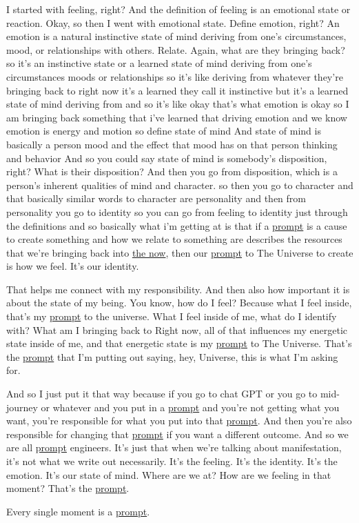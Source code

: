 I started with feeling, right? And the definition of feeling is an emotional state or reaction. Okay, so then I went with emotional state. Define emotion, right? An emotion is a natural instinctive state of mind deriving from one's circumstances, mood, or relationships with others. Relate. Again, what are they bringing back? so it's an instinctive state or a learned state of mind deriving from one's circumstances moods or relationships so it's like deriving from whatever they're bringing back to right now it's a learned they call it instinctive but it's a learned state of mind deriving from and so it's like okay that's what emotion is okay so I am bringing back something that i've learned that driving emotion and we know emotion is energy and motion so define state of mind And state of mind is basically a person mood and the effect that mood has on that person thinking and behavior And so you could say state of mind is somebody's disposition, right? What is their disposition? And then you go from disposition, which is a person's inherent qualities of mind and character. so then you go to character and that basically similar words to character are personality and then from personality you go to identity so you can go from feeling to identity just through the definitions and so basically what i'm getting at is that if a \hyperlink{gloss:prompt}{prompt} is a cause to create something and how we relate to something are describes the resources that we're bringing back into \hyperlink{gloss:the_now}{the now}, then our \hyperlink{gloss:prompt}{prompt} to The Universe to create is how we feel. It's our identity. 

That helps me connect with my responsibility. And then also how important it is about the state of my being. You know, how do I feel? Because what I feel inside, that's my \hyperlink{gloss:prompt}{prompt} to the universe. What I feel inside of me, what do I identify with? What am I bringing back to Right now, all of that influences my energetic state inside of me, and that energetic state is my \hyperlink{gloss:prompt}{prompt} to The Universe. That's the \hyperlink{gloss:prompt}{prompt} that I'm putting out saying, hey, Universe, this is what I'm asking for. 

And so I just put it that way because if you go to chat GPT or you go to mid-journey or whatever and you put in a \hyperlink{gloss:prompt}{prompt} and you're not getting what you want, you're responsible for what you put into that \hyperlink{gloss:prompt}{prompt}. And then you're also responsible for changing that \hyperlink{gloss:prompt}{prompt} if you want a different outcome. And so we are all \hyperlink{gloss:prompt}{prompt} engineers. It's just that when we're talking about manifestation, it's not what we write out necessarily. It's the feeling. It's the identity. It's the emotion. It's our state of mind. Where are we at? How are we feeling in that moment? That's the \hyperlink{gloss:prompt}{prompt}. 

Every single moment is a \hyperlink{gloss:prompt}{prompt}.
